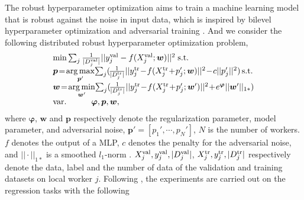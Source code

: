 \documentclass[letterpaper]{article} %
\begin{document}
The robust hyperparameter optimization \cite{sato2021gradient} aims to train a machine learning model that is robust against the noise in input data, which is inspired by bilevel hyperparameter optimization \cite{chen2022single} and adversarial training \cite{han2023fedal,zhang2022revisiting}. And we consider the following distributed robust hyperparameter optimization problem,
\begin{equation}
\begin{array}{l}
\mathop {\min }\sum\nolimits_{j} \frac{1}{|D^{\rm{val}}_j|}|| y^{\rm{val}}_j - f(X^{\rm{val}}_j;{\boldsymbol{w}})||^2 \;{\mathop{\rm s.t.}} \\

{\boldsymbol{p}} \!=\! \mathop {\arg \max } \limits_{{\boldsymbol{p}}'} \! \sum\nolimits_{j} (\! \frac{1}{{|D^{\rm{tr}}_j|}} ||y^{\rm{tr}}_j\! -\! f(X^{\rm{tr}}_j\! +\! {p_j'} ;{\boldsymbol{w}}) ||^2 \! -\! c||{p_j'} ||^2) \,{\mathop{\rm s.t.}}\\

{\boldsymbol{w}} \!=\! \mathop {\arg \min }\limits_{{\boldsymbol{w}}'}\!\sum\nolimits_{j}(\! \frac{1}{{|D^{\rm{tr}}_j|}} ||y^{\rm{tr}}_j\! -\! f(X^{\rm{tr}}_j \!+\! {p_j'} ;{\boldsymbol{w}}') ||^2  \!+\! e^{{\boldsymbol{\varphi }}} ||{\boldsymbol{w}}'||_{1*})  \\
{\mathop{\rm var.}} \qquad \quad {\boldsymbol{\varphi }} ,{\boldsymbol{p}},{\boldsymbol{w}},
\end{array}
\end{equation}
where ${\boldsymbol{\varphi }}$, ${\boldsymbol{w }}$ and ${\boldsymbol{p}}$ respectively denote the regularization parameter, model parameter, and adversarial noise,   ${\boldsymbol{p}}'=[p_1',\cdots,p_N']$, $N$ is the number of workers. $f$ denotes the output of a MLP, $c$ denotes the penalty for the adversarial noise, and $|| \cdot ||_{1*}$ is a  smoothed $l_1$-norm \cite{saheya2019neural}. $X^{\rm{val}}_j, y^{\rm{val}}_j, {|D^{\rm{val}}_j|}$, $X^{\rm{tr}}_j, y^{\rm{tr}}_j, {|D^{\rm{tr}}_j|}$ respectively denote the data, label and the number of data of the validation and training datasets on local worker $j$. Following \cite{sato2021gradient}, the experiments are carried out on the regression tasks with the following
\end{document}
